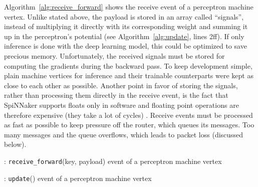 \documentclass[]{article}
\begin{document}
Algorithm~\ref{alg:receive_forward} shows the receive event of a
perceptron machine vertex.
Unlike stated above, the payload is stored in an array called
``signals'',
instead of multiplying it directly with its corresponding weight and
summing it up in the perceptron's potential
(see Algorithm~\ref{alg:update}, lines 2ff).
If only inference is done with the deep learning model, this could
be optimized to save precious memory.
Unfortunately, the received signals must be stored for computing the
gradients during the backward pass.
To keep development simple, plain machine vertices for inference and
their trainable counterparts were kept as close to each other as
possible.
Another point in favor of storing the signals, rather than processing
them directly in the receive event, is the fact that SpiNNaker
supports floats only in software and floating point operations are
therefore expensive (they take a lot of cycles)
\citep{furber_et_al_2020}.
Receive events must be processed as fast as possible to keep pressure
off the router, which queues its messages.
Too many messages and the queue overflows, which leads to packet loss
(discussed below).

\begin{algorithm} %
  \caption{: \texttt{receive\_forward}(key, payload) event of a
    perceptron machine vertex}
  \label{alg:receive_forward}

  \begin{algorithmic}[1]
  \end{algorithmic}
\end{algorithm} %

\begin{algorithm} %
  \caption{: \texttt{update}() event of a perceptron machine vertex}
  \label{alg:update}

  \begin{algorithmic}[1]
      \ENDFOR
    \ENDIF
  \end{algorithmic}
\end{algorithm} %
\end{document}
